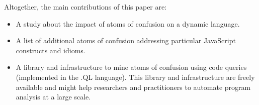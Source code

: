 Altogether, the main contributions of this paper are:

\begin{itemize}
    \item A study about the impact of atoms of confusion on a
    dynamic language.
    \item A list of additional atoms of confusion addressing particular 
    JavaScript constructs and idioms.
    \item A library and infrastructure to mine atoms of confusion using 
    code queries (implemented in the .QL language). This library and 
    infrastructure are freely available and might help researchers and 
    practitioners to automate program analysis at a large scale.
\end{itemize}






